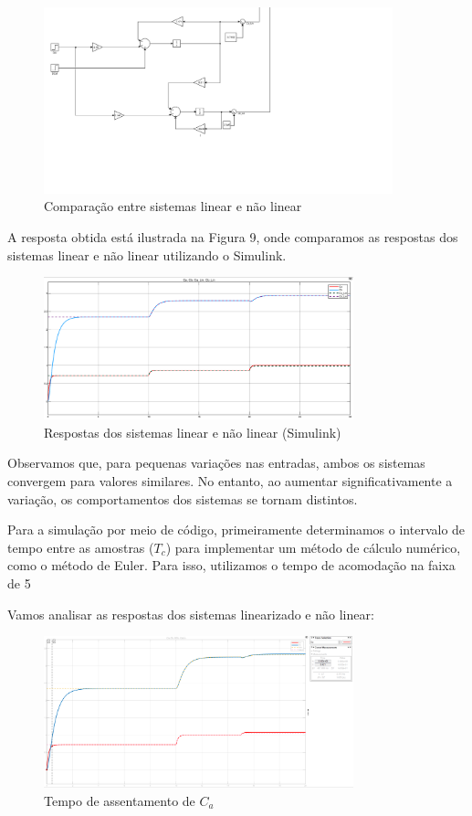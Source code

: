 \documentclass[a4paper,12pt]{report}
\begin{document}
\begin{figure}[h]
    \centering
    \includegraphics[width=0.9\textwidth]{figura8.png}
    \caption{Comparação entre sistemas linear e não linear}
\end{figure}

A resposta obtida está ilustrada na Figura 9, onde comparamos as respostas dos sistemas linear e não linear utilizando o Simulink.

\begin{figure}[h]
    \centering
    \includegraphics[width=0.8\textwidth]{figura9.png}
    \caption{Respostas dos sistemas linear e não linear (Simulink)}
\end{figure}

Observamos que, para pequenas variações nas entradas, ambos os sistemas convergem para valores similares. No entanto, ao aumentar significativamente a variação, os comportamentos dos sistemas se tornam distintos.

Para a simulação por meio de código, primeiramente determinamos o intervalo de tempo entre as amostras (\(T_c\)) para implementar um método de cálculo numérico, como o método de Euler. Para isso, utilizamos o tempo de acomodação na faixa de 5%

Vamos analisar as respostas dos sistemas linearizado e não linear:

\begin{figure}[h]
    \centering
    \includegraphics[width=0.8\textwidth]{figura10.png}
    \caption{Tempo de assentamento de \(C_a\)}
\end{figure}
\end{document}
